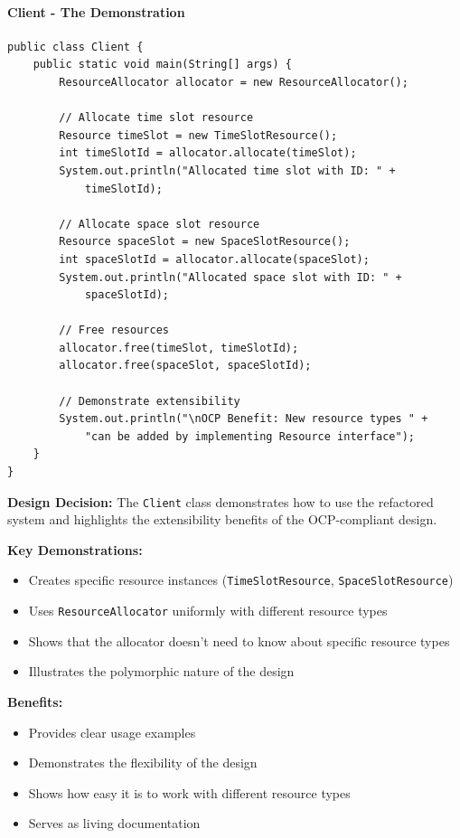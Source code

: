 \paragraph{Client - The Demonstration}

\begin{verbatim}
public class Client {
    public static void main(String[] args) {
        ResourceAllocator allocator = new ResourceAllocator();
        
        // Allocate time slot resource
        Resource timeSlot = new TimeSlotResource();
        int timeSlotId = allocator.allocate(timeSlot);
        System.out.println("Allocated time slot with ID: " + 
            timeSlotId);
        
        // Allocate space slot resource
        Resource spaceSlot = new SpaceSlotResource();
        int spaceSlotId = allocator.allocate(spaceSlot);
        System.out.println("Allocated space slot with ID: " + 
            spaceSlotId);
        
        // Free resources
        allocator.free(timeSlot, timeSlotId);
        allocator.free(spaceSlot, spaceSlotId);
        
        // Demonstrate extensibility
        System.out.println("\nOCP Benefit: New resource types " +
            "can be added by implementing Resource interface");
    }
}
\end{verbatim}

\textbf{Design Decision:} The \texttt{Client} class demonstrates how to use the refactored system and highlights the extensibility benefits of the OCP-compliant design.

\textbf{Key Demonstrations:}
\begin{itemize}
    \item Creates specific resource instances (\texttt{TimeSlotResource}, \texttt{SpaceSlotResource})
    \item Uses \texttt{ResourceAllocator} uniformly with different resource types
    \item Shows that the allocator doesn't need to know about specific resource types
    \item Illustrates the polymorphic nature of the design
\end{itemize}

\textbf{Benefits:}
\begin{itemize}
    \item Provides clear usage examples
    \item Demonstrates the flexibility of the design
    \item Shows how easy it is to work with different resource types
    \item Serves as living documentation
\end{itemize}


